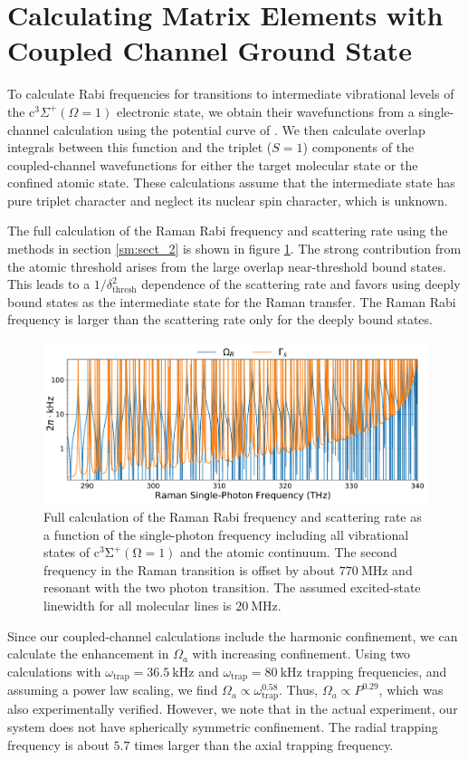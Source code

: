 \documentclass[aps,secnumarabic,amsmath,amssymb,10pt,superscriptaddress]{revtex4}
\newcommand{\todo}[1]{}
\begin{document}
\section{Calculating Matrix Elements with Coupled Channel Ground State}
To calculate Rabi frequencies for transitions to intermediate vibrational levels of the c$^3\Sigma^+ (\Omega=1)$ electronic state, we
obtain their wavefunctions from a single-channel calculation using the potential curve of \cite{Grochola2011}. We
then calculate overlap integrals between this function and the triplet ($S=1$) components of the
coupled-channel wavefunctions for either the target molecular state or the confined atomic state.
These calculations assume that the intermediate state has pure triplet character and neglect its
nuclear spin character, which is unknown.

The full calculation of the Raman Rabi frequency and scattering rate using the methods in section \ref{sm:sect_2} is shown in figure \ref{f-sm}. The strong contribution from the atomic threshold arises from the large overlap near-threshold bound states. This leads to a $1/\delta_{\text{thresh}}^2$ dependence of the scattering rate and favors using deeply bound states as the intermediate state for the Raman transfer. The Raman Rabi frequency is larger than the scattering rate only for the deeply bound states.

\begin{figure}[ht!]
  \includegraphics[width=\textwidth]{imgs/raman_theory_full.pdf}
  \caption{ Full calculation of the Raman Rabi frequency and scattering rate as a function of the single-photon frequency including all vibrational states of $ \mathrm{c^3\Sigma^+(\Omega = 1)}$ and the atomic continuum. The second frequency in the Raman transition is offset by about $770~\mathrm{MHz}$ and resonant with the two photon transition. The assumed excited-state linewidth for all molecular lines is $20~\text{MHz} $.
    \label{f-sm}}
\end{figure}


Since our coupled-channel calculations include the harmonic confinement, we can calculate the enhancement in $\Omega_a$ with increasing confinement. Using two calculations with $ \omega_{\text{trap}} = 36.5~\mathrm{kHz}$ and $\omega_{\text{trap}} = 80~\mathrm{kHz}$ trapping frequencies, and assuming a power law scaling, we find $ \Omega_a \propto \omega_{\text{trap}}^{0.58} $. Thus, $\Omega_a \propto P^{0.29} $, which was also experimentally verified. However, we note that in the actual experiment, our system does not have spherically symmetric confinement. The radial trapping frequency is about $5.7$ times larger than the axial trapping frequency.
\todo{
  Power/intensity calibration
}


\end{document}
